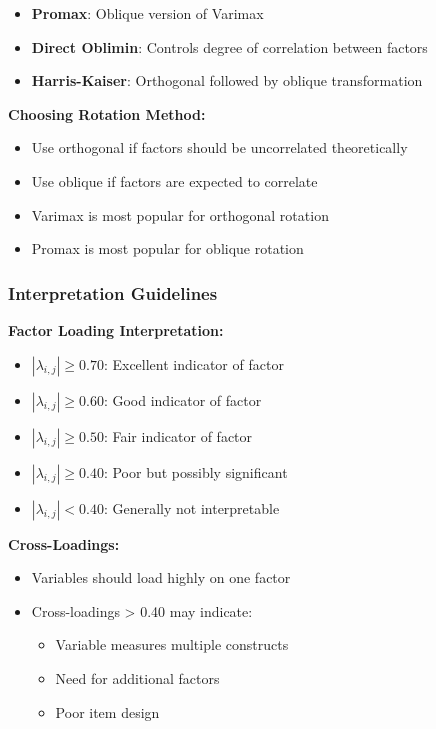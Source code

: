 \documentclass[
]{article}
\begin{document}
\begin{itemize}
\item
  \textbf{Promax}: Oblique version of Varimax
\item
  \textbf{Direct Oblimin}: Controls degree of correlation between
  factors
\item
  \textbf{Harris-Kaiser}: Orthogonal followed by oblique transformation
\end{itemize}

\textbf{Choosing Rotation Method:}

\begin{itemize}
\item
  Use orthogonal if factors should be uncorrelated theoretically
\item
  Use oblique if factors are expected to correlate
\item
  Varimax is most popular for orthogonal rotation
\item
  Promax is most popular for oblique rotation
\end{itemize}

\subsubsection{Interpretation Guidelines}

\textbf{Factor Loading Interpretation:}

\begin{itemize}
\item
  \(|\lambda_{i,j}| \geq 0.70\): Excellent indicator of factor
\item
  \(|\lambda_{i,j}| \geq 0.60\): Good indicator of factor
\item
  \(|\lambda_{i,j}| \geq 0.50\): Fair indicator of factor
\item
  \(|\lambda_{i,j}| \geq 0.40\): Poor but possibly significant
\item
  \(|\lambda_{i,j}| < 0.40\): Generally not interpretable
\end{itemize}

\textbf{Cross-Loadings:}

\begin{itemize}
\item
  Variables should load highly on one factor
\item
  Cross-loadings \textgreater{} 0.40 may indicate:

  \begin{itemize}
  \item
    Variable measures multiple constructs
  \item
    Need for additional factors
  \item
    Poor item design
  \end{itemize}
\end{itemize}
\end{document}
